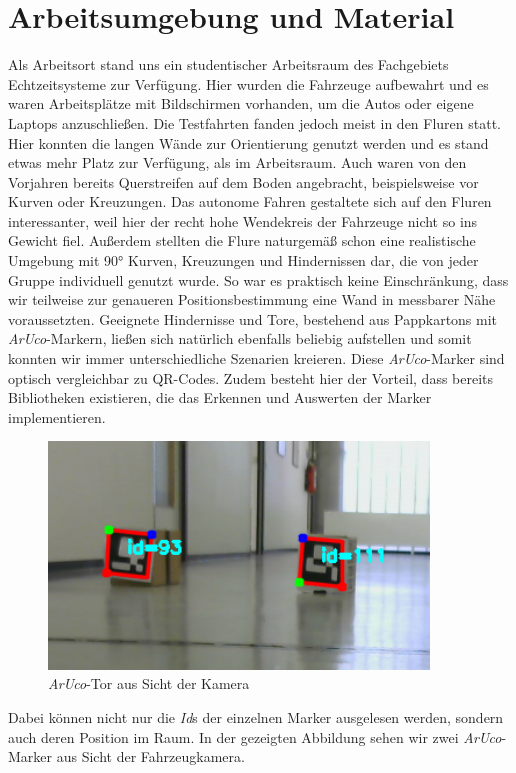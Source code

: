 \section{Arbeitsumgebung und Material}
\label{sec:arbeitsumgebung}
Als Arbeitsort stand uns ein studentischer Arbeitsraum des Fachgebiets Echtzeitsysteme zur Verfügung. Hier wurden die Fahrzeuge aufbewahrt und es waren Arbeitsplätze mit Bildschirmen vorhanden, um die Autos oder eigene Laptops anzuschließen. 
\newline
Die Testfahrten fanden jedoch meist in den Fluren statt. Hier konnten die langen Wände zur Orientierung genutzt werden und es stand etwas mehr Platz zur Verfügung, als im Arbeitsraum. Auch waren von den Vorjahren bereits Querstreifen auf dem Boden angebracht, beispielsweise vor Kurven oder Kreuzungen. Das autonome Fahren gestaltete sich auf den Fluren interessanter, weil hier der recht hohe Wendekreis der Fahrzeuge nicht so ins Gewicht fiel. Außerdem stellten die Flure naturgemäß schon eine realistische Umgebung mit 90° Kurven, Kreuzungen und Hindernissen dar, die von jeder Gruppe individuell genutzt wurde. So war es praktisch keine Einschränkung, dass wir teilweise zur genaueren Positionsbestimmung eine Wand in messbarer Nähe voraussetzten. Geeignete Hindernisse und Tore, bestehend aus Pappkartons mit \textit{ArUco}-Markern, ließen sich natürlich ebenfalls beliebig aufstellen und somit konnten wir immer unterschiedliche Szenarien kreieren. Diese \textit{ArUco}-Marker sind optisch vergleichbar zu QR-Codes. Zudem besteht hier der Vorteil, dass bereits Bibliotheken existieren, die das Erkennen und Auswerten der Marker implementieren.
\begin{figure}[hp] 
  \centering
     \includegraphics[width=0.9\textwidth]{images/flur.png}
  \caption{\textit{ArUco}-Tor aus Sicht der Kamera}
  \label{fig:ArUco-Tor aus Sicht der Kamera}
\end{figure}
\newline
Dabei können nicht nur die \textit{Id}s der einzelnen Marker ausgelesen werden, sondern auch deren Position im Raum. In der gezeigten Abbildung sehen wir zwei \textit{ArUco}-Marker aus Sicht der Fahrzeugkamera.
